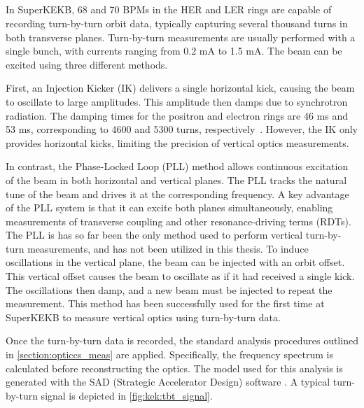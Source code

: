 \FloatBarrier
\subsection{}

In SuperKEKB, 68 and 70 BPMs in the HER and LER rings are capable of recording turn-by-turn
orbit data, typically capturing several thousand turns in both transverse planes. Turn-by-turn measurements
are usually performed with a single bunch, with currents ranging from 0.2 mA to 1.5 mA. The beam can
be excited using three different methods.

First, an Injection Kicker (IK) delivers a single horizontal kick, causing the beam to oscillate to large 
amplitudes. This amplitude then damps
due to synchrotron radiation. The damping times for the positron and electron rings are 46 ms and 53
ms, corresponding to 4600 and 5300 turns, respectively~\cite{keintzel_jacqueline_beam_2022}.
However, the IK only provides horizontal kicks, limiting the precision of vertical optics
measurements.

In contrast, the Phase-Locked Loop (PLL) method allows continuous excitation of the beam in both horizontal and vertical planes. The PLL tracks the natural tune of the beam and drives it
at the corresponding frequency. A key advantage of the PLL system is that it can excite both planes
simultaneously, enabling measurements of transverse coupling and other resonance-driving terms
(RDTs). The PLL is has so far been the only method used to perform vertical turn-by-turn measurements, and has 
not been utilized in this thesis.
To induce oscillations in the vertical plane, the 
beam can be injected with an orbit offset. This vertical offset causes the beam to oscillate as if 
it had received a single kick. The oscillations then damp, and a new beam must be injected to repeat 
the measurement. This method has been successfully used for the first time at SuperKEKB to measure vertical
optics using turn-by-turn data.

Once the turn-by-turn data is recorded, the standard analysis procedures outlined in
\cref{section:opticcs_meas} are applied. Specifically, the frequency spectrum is calculated before
reconstructing the optics. The model used for this analysis is generated with the SAD (Strategic
Accelerator Design) software \cite{noauthor_sad_nodate}.
A typical turn-by-turn signal is depicted in \cref{fig:kek:tbt_signal}.


